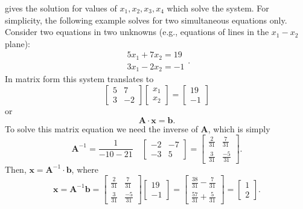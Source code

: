 gives the solution for values of $x_1, x_2, x_3, x_4$ which solve the system. For simplicity, the following example 
solves for two simultaneous equations only. Consider two equations in two unknowns (e.g., equations of lines 
in the $x_1-x_2$ plane):
\begin{equation}
\begin{array}{c}
5x_1 + 7x_{2} = 19\\
3x_1 - 2 x_2 = -1
\end{array} .
\end{equation}
In matrix form this system translates to
\begin{equation}
\left[ \begin{array}{cc}
5 & 7\\
3 & -2 
\end{array}
\right ] 
\left[
\begin{array}{c}
x_1\\
x_2
\end{array}
\right ] =
\left[ \begin{array}{c}
19\\
-1
\end{array}
\right ]
\end{equation}
or
\begin{equation}
\mathbf{A \cdot x = b}.
\end{equation}
To solve this matrix equation we need the inverse of $\mathbf{A}$, which is simply
\begin{equation}
\mathbf{A}^{-1} = \frac{1}{-10 - 21} \quad
\left[ \begin{array}{cc}
-2 & -7\\
-3 & 5
\end{array}\right ] = \left[ \begin{array}{cc}
\frac{2}{31} & \frac{7}{31}\\[4pt]
\frac{3}{31} & \frac{-5}{31}
\end{array} \right ] .
\end{equation}	 
Then, $\mathbf{x = A}^{-1}\cdot \mathbf{b}$, where
\begin{equation}
\mathbf{x = A}^{-1}\mathbf{b} = \left[ \begin{array}{cc}
\frac{2}{31} & \frac{7}{31}\\[4pt]
\frac{3}{31} & \frac{-5}{31}
\end{array}
\right] 
\left[ \begin{array}{c}
19\\
-1
\end{array} \right ] = \left [ \begin{array}{c}
\frac{38}{31} - \frac{7}{31} \\[4pt]
\frac{57}{31} + \frac{5}{31}
\end{array} \right ]
= \left[ \begin{array}{c}
1 \\
2 \end{array} \right ] .
\end{equation}
